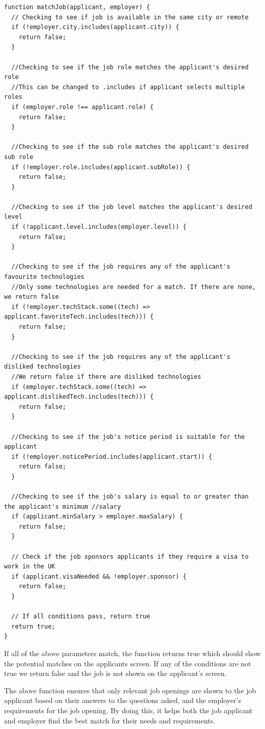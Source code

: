 \begin{lstlisting}
function matchJob(applicant, employer) {
  // Checking to see if job is available in the same city or remote
  if (!employer.city.includes(applicant.city)) {
    return false;
  }

  //Checking to see if the job role matches the applicant's desired role
  //This can be changed to .includes if applicant selects multiple roles
  if (employer.role !== applicant.role) {
    return false;
  }

  //Checking to see if the sub role matches the applicant's desired sub role
  if (!employer.role.includes(applicant.subRole)) {
    return false;
  }

  //Checking to see if the job level matches the applicant's desired level
  if (!applicant.level.includes(employer.level)) {
    return false;
  }

  //Checking to see if the job requires any of the applicant's favourite technologies
  //Only some technologies are needed for a match. If there are none, we return false
  if (!employer.techStack.some((tech) => applicant.favoriteTech.includes(tech))) {
    return false;
  }

  //Checking to see if the job requires any of the applicant's disliked technologies
  //We return false if there are disliked technologies
  if (employer.techStack.some((tech) => applicant.dislikedTech.includes(tech))) {
    return false;
  }

  //Checking to see if the job's notice period is suitable for the applicant
  if (!employer.noticePeriod.includes(applicant.start)) {
    return false;
  }

  //Checking to see if the job's salary is equal to or greater than the applicant's minimum //salary
  if (applicant.minSalary > employer.maxSalary) {
    return false;
  }

  // Check if the job sponsors applicants if they require a visa to work in the UK
  if (applicant.visaNeeded && !employer.sponsor) {
    return false;
  }

  // If all conditions pass, return true
  return true;
}
\end{lstlisting}
If all of the above parameters match, the function returns true which should show the potential matches on the applicants screen. If any of the conditions are not true we return false and the job is not shown on the applicant's screen.

The above function ensures that only relevant job openings are shown to the job applicant based on their answers to the questions asked, and the employer's requirements for the job opening. By doing this, it helps both the job applicant and employer find the best match for their needs and requirements.

